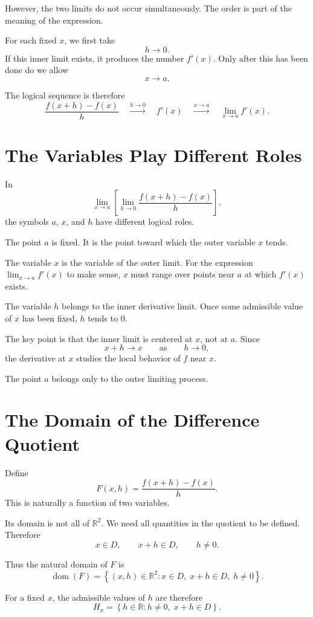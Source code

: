\documentclass{essay}
\begin{document}
However, the two limits do not occur simultaneously. The order is part of the meaning of the expression.

For each fixed \(x\), we first take
\[
h\to 0.
\]
If this inner limit exists, it produces the number \(f'(x)\). Only after this has been done do we allow
\[
x\to a.
\]

The logical sequence is therefore
\[
\frac{f(x+h)-f(x)}{h}
\quad\xrightarrow{h\to 0}\quad
f'(x)
\quad\xrightarrow{x\to a}\quad
\lim_{x\to a}f'(x).
\]

\section{The Variables Play Different Roles}

In
\[
\lim_{x\to a}
\left[
\lim_{h\to 0}
\frac{f(x+h)-f(x)}{h}
\right],
\]
the symbols \(a\), \(x\), and \(h\) have different logical roles.

The point \(a\) is fixed. It is the point toward which the outer variable \(x\) tends.

The variable \(x\) is the variable of the outer limit. For the expression \(\lim_{x\to a}f'(x)\) to make sense, \(x\) must range over points near \(a\) at which \(f'(x)\) exists.

The variable \(h\) belongs to the inner derivative limit. Once some admissible value of \(x\) has been fixed, \(h\) tends to \(0\).

The key point is that the inner limit is centered at \(x\), not at \(a\). Since
\[
x+h\to x
\qquad\text{as}\qquad
h\to 0,
\]
the derivative at \(x\) studies the local behavior of \(f\) near \(x\).

The point \(a\) belongs only to the outer limiting process.

\section{The Domain of the Difference Quotient}

Define
\[
F(x,h)
=
\frac{f(x+h)-f(x)}{h}.
\]
This is naturally a function of two variables.

Its domain is not all of \(\mathbb{R}^2\). We need all quantities in the quotient to be defined. Therefore
\[
x\in D,
\qquad
x+h\in D,
\qquad
h\neq 0.
\]

Thus the natural domain of \(F\) is
\[
\boxed{
\operatorname{dom}(F)
=
\left\{
(x,h)\in\mathbb{R}^2:
x\in D,\;
x+h\in D,\;
h\neq 0
\right\}.
}
\]

For a fixed \(x\), the admissible values of \(h\) are therefore
\[
H_x
=
\left\{
h\in\mathbb{R}:
h\neq 0,\;
x+h\in D
\right\}.
\]
\end{document}

